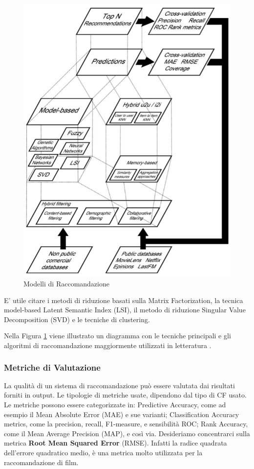 \documentclass[12pt]{article}
\begin{document}
\begin{figure}[H]
	\centering
	\includegraphics[scale=0.40]{images/model-recomm.png}
	\caption{Modelli di Raccomandazione \cite{Bobadilla:2013:RSS:2483330.2483573}}
	\label{model-rec}
\end{figure}

E' utile citare i metodi di riduzione basati sulla Matrix Factorization, la tecnica model-based Latent Semantic Index (LSI), il metodo di riduzione Singular Value Decomposition
(SVD) e le tecniche di clustering.

Nella Figura \ref{model-rec} viene illustrato un diagramma con le tecniche principali e gli algoritmi di raccomandazione maggiormente utilizzati in letteratura \cite{Bobadilla:2013:RSS:2483330.2483573}.

\subsubsection{Metriche di Valutazione}
La qualità di un sistema di raccomandazione può essere valutata dai risultati forniti in output. Le tipologie di metriche usate, dipendono dal tipo di CF usato. Le metriche possono essere categorizzate in:
Predictive Accuracy, come ad esempio il Mean Absolute Error
(MAE) e sue varianti; Classification Accuracy metrics, come la precision, recall, F1-measure, e sensibilità ROC; Rank Accuracy, come il Mean Average Precision (MAP), e così via.
Desideriamo concentrarci sulla metrica \textbf{Root Mean Squared Error} (RMSE). Infatti la radice quadrata dell'errore quadratico medio, è una metrica molto utilizzata per la raccomandazione di film.
\end{document}
